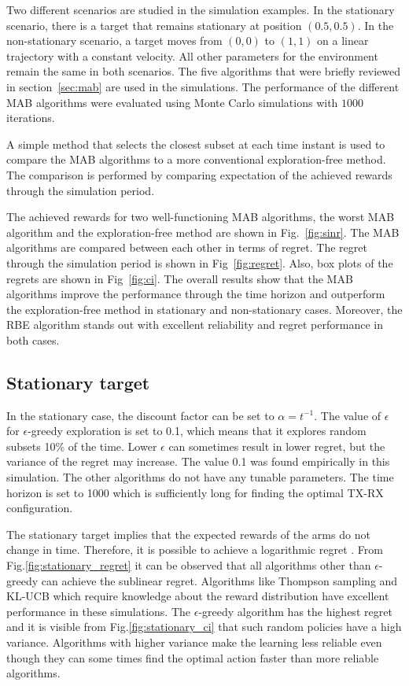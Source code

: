 \documentclass[conference]{IEEEtran}
\begin{document}
Two different scenarios are studied in the simulation examples. 
In the stationary scenario, there is a target that remains stationary at position $(0.5, 0.5)$.
In the non-stationary scenario, a target moves from $(0, 0)$ to $(1, 1)$ on a linear trajectory with a constant velocity.
All other parameters for the environment remain the same in both scenarios.
The five algorithms that were briefly reviewed in section~\ref{sec:mab} are used in the simulations.
The performance of the different MAB algorithms were evaluated using Monte Carlo simulations with $1000$ iterations.

A simple method that selects the closest subset at each time instant is used to compare the MAB algorithms to a more conventional exploration-free method. 
The comparison is performed by comparing expectation of the achieved rewards through the simulation period. 

The achieved rewards for two well-functioning MAB algorithms, 
the worst MAB algorithm and the exploration-free method are shown in Fig.~\ref{fig:sinr}. 
The MAB algorithms are compared between each other in terms of regret. 
The regret through the simulation period is shown in Fig~\ref{fig:regret}. 
Also, box plots of the regrets are shown in Fig~\ref{fig:ci}.
The overall results show that the MAB algorithms improve the performance through the time horizon and outperform the exploration-free method in stationary and non-stationary cases.
Moreover, the RBE algorithm stands out with excellent reliability and regret performance in both cases.

\subsection{Stationary target}

In the stationary case, the discount factor can be set to $\alpha=t^{-1}$.
The value of $\epsilon$ for $\epsilon$-greedy exploration is set to 0.1, which means that it explores random subsets 10\% of the time.
Lower $\epsilon$ can sometimes result in lower regret, but the variance of the regret may increase.
The value 0.1 was found empirically in this simulation.
The other algorithms do not have any tunable parameters.
The time horizon is set to 1000 which is sufficiently long for finding the optimal TX-RX configuration.

The stationary target implies that the expected rewards of the arms do not change in time.
Therefore, it is possible to achieve a logarithmic regret \cite{Lattimore2019}.
From Fig.\ref{fig:stationary_regret} it can be observed that all algorithms other than $\epsilon$-greedy can achieve the sublinear regret.
Algorithms like Thompson sampling and KL-UCB which require knowledge about the reward distribution have excellent performance in these simulations.
The $\epsilon$-greedy algorithm has the highest regret and it is visible from Fig.\ref{fig:stationary_ci} that such random policies have a high variance.
Algorithms with higher variance make the learning less reliable even though they can some times find the optimal action faster than more reliable algorithms.
\end{document}
